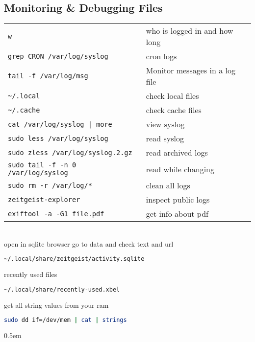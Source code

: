 \documentclass[fontsize=6pt,paper=a4,paper=landscape,twoside=false,parskip=half,
headings=small,numbers=withenddot,usegeometry=true,english]{scrartcl}
\providecommand{\sectionbox}[1]{{\fboxsep0.5em\hspace*{-1.5\fboxsep}%
 \fcolorbox{gray}{gray!3}{%
 \parbox{\columnwidth}{%
 \raggedright #1}}}}
\begin{document}
\begin{multicols}{4}
{	\subsection{Monitoring \& Debugging Files}\label{sec:monitoringdebugging}
	\begin{tabular}{@{}ll@{}}\toprule
		\texttt{w}  &  who is logged in and how long\\
		\texttt{grep CRON /var/log/syslog}  &  cron logs\\
		\texttt{tail -f /var/log/msg}  &  Monitor messages in a log file\\
		\texttt{\textasciitilde/.local}  &  check local files\\
		\texttt{\textasciitilde/.cache}  &  check cache files\\
		\texttt{cat /var/log/syslog | more}  &  view syslog\\
		\texttt{sudo less /var/log/syslog}  &  read syslog\\
		\texttt{sudo zless /var/log/syslog.2.gz}  &  read archived logs\\
		\texttt{sudo tail -f -n 0 /var/log/syslog}  &  read while changing\\
		\texttt{sudo rm -r /var/log/*}  &  clean all logs\\
		\texttt{zeitgeist-explorer}  &  inspect public logs\\
		\texttt{exiftool -a -G1 file.pdf}  &  get info about pdf\\
		\bottomrule
	\end{tabular}\\
	open in sqlite  browser go to data and check text and url\\
	\begin{lstlisting}[language=bash]
~/.local/share/zeitgeist/activity.sqlite
	\end{lstlisting}
	recently used files\\
	\begin{lstlisting}[language=bash]
~/.local/share/recently-used.xbel
	\end{lstlisting}
	get all string values from your ram\\
	\begin{lstlisting}[language=bash]
sudo dd if=/dev/mem | cat | strings
	\end{lstlisting}
}

\sectionbox{
}
\end{multicols}
\end{document}
